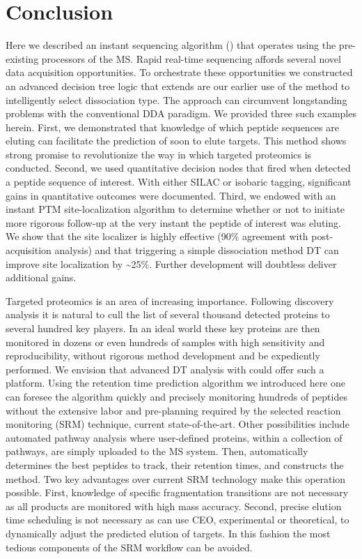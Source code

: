 \section{Conclusion}

Here we described an instant sequencing algorithm (\inseq{}) that operates using the pre-existing processors of the MS. Rapid real-time sequencing affords several novel data acquisition opportunities. To orchestrate these opportunities we constructed an advanced decision tree logic that extends are our earlier use of the method to intelligently select dissociation type. The approach can circumvent longstanding problems with the conventional DDA paradigm. We provided three such examples herein. First, we demonstrated that knowledge of which peptide sequences are eluting can facilitate the prediction of soon to elute targets. This method shows strong promise to revolutionize the way in which targeted proteomics is conducted. Second, we used quantitative decision nodes that fired when \inseq{} detected a peptide sequence of interest. With either SILAC or isobaric tagging, significant gains in quantitative outcomes were documented. Third, we endowed \inseq{} with an instant PTM site-localization algorithm to determine whether or not to initiate more rigorous follow-up at the very instant the peptide of interest was eluting. We show that the \inseq{} site localizer is highly effective (90\% agreement with post-acquisition analysis) and that triggering a simple dissociation method DT can improve site localization by \textasciitilde25\%. Further development will doubtless deliver additional gains.

Targeted proteomics is an area of increasing importance. Following discovery analysis it is natural to cull the list of several thousand detected proteins to several hundred key players. In an ideal world these key proteins are then monitored in dozens or even hundreds of samples with high sensitivity and reproducibility, without rigorous method development and be expediently performed. We envision that advanced DT analysis with \inseq{} could offer such a platform. Using the retention time prediction algorithm we introduced here one can foresee the \inseq{} algorithm quickly and precisely monitoring hundreds of peptides without the extensive labor and pre-planning required by the selected reaction monitoring (SRM) technique, current state-of-the-art.\cite{srm} Other possibilities include automated pathway analysis where user-defined proteins, within a collection of pathways, are simply uploaded to the MS system. Then, \inseq{} automatically determines the best peptides to track, their retention times, and constructs the method. Two key advantages over current SRM technology make this operation possible. First, knowledge of specific fragmentation transitions are not necessary as all products are monitored with high mass accuracy. Second, precise elution time scheduling is not necessary as \inseq{} can use CEO, experimental or theoretical, to dynamically adjust the predicted elution of targets. In this fashion the most tedious components of the SRM workflow can be avoided.

